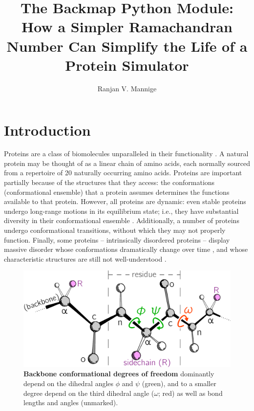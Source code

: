 \documentclass[fleqn,10pt,lineno]{wlpeerj} %
\title{The Backmap Python Module: How a Simpler Ramachandran Number Can Simplify the Life of a Protein Simulator}
\author[1,*]{Ranjan V. Mannige}
\affil[1]{~Multiscale Institute, Berkeley Lake, GA 30092, U.S.A.}
\affil[*]{~ranjanmannige@gmail.com}
\begin{document}
\flushbottom
\maketitle
\thispagestyle{empty}

\section*{Introduction}

Proteins are a class of biomolecules unparalleled in their functionality \citep{Berg2006}. A natural protein may be thought of as a linear chain of amino acids, each normally sourced from a repertoire of 20 naturally occurring amino acids. 
Proteins are important partially because of the structures that they access: the conformations (conformational ensemble) that a protein assumes determines the functions available to that protein. However, all proteins are dynamic: even stable proteins undergo long-range motions in its equilibrium state; i.e., they have substantial diversity in their conformational ensemble \citep{Mannige2014b}. Additionally, a number of proteins undergo conformational transitions, without which they may not properly function. Finally, some proteins -- intrinsically disordered proteins -- display massive disorder whose conformations dramatically change over time \citep{Uversky2003, Fink2005, Midic2009, Espinoza-Fonseca2009, Uversky2010, Tompa2011, Sibille2012, Kosol2013, Dunker2013, Geist2013, Baruah2015}, and whose characteristic structures are still not well-understood \citep{Beck2008}.

\begin{figure}[b!]
\centering
\includegraphics[width=0.4\linewidth]{figures/peptide_small.pdf}
\caption{\textbf{Backbone conformational degrees of freedom} dominantly depend on the dihedral angles $\phi$ and $\psi$ (green), and to a smaller degree depend on the third dihedral angle ($\omega$; red) as well as bond lengths and angles (unmarked). \label{fig:intro}} 
\end{figure}
\end{document}
